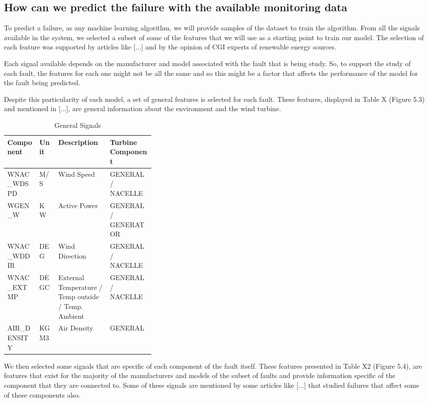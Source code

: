 
\subsection{How can we predict the failure with the available monitoring data} 
\label{sub:if_you_use_this_template} 

To predict a failure, as any machine learning algorithm, we will provide samples of the dataset to train the algorithm. From all the signals available in the system, we selected a subset of some of the features that we will use as a starting point to train our model. The selection of each feature was supported by articles like \cite{OLD_41_WIND} [...] and by the opinion of CGI experts of renewable energy sources.

Each signal available depends on the manufacturer and model associated with the fault that is being study. So, to support the study of each fault, the features for each one might not be all the same and so this might be a factor that affects the performance of the model for the fault being predicted.

Despite this particularity of each model, a set of general features is selected for each fault. These features, displayed in Table X (Figure 5.3) and mentioned in \cite{OLD_41_WIND} [...], are general information about the environment and the wind turbine.

\begin{table}[!ht]
    \centering
    \begin{tabular}{|l|l|p{0.35\linewidth}|l|}
    \hline
        Component & Unit & Description & Turbine Component \\ \hline
        WNAC\_WDSPD & M/S & Wind Speed & GENERAL / NACELLE \\ \hline
        WGEN\_W & KW & Active Power & GENERAL / GENERATOR \\ \hline
        WNAC\_WDDIR & DEG & Wind Direction & GENERAL / NACELLE \\ \hline
        WNAC\_EXTMP & DEGC & External Temperature / Temp outside / Temp. Ambient & GENERAL / NACELLE \\ \hline
        AIR\_DENSITY & KGM3 & Air Density & GENERAL \\ \hline
    \end{tabular}
    \caption{General Signals}
    \label{GeneralSignals}
\end{table}

We then selected some signals that are specific of each component of the fault itself. These features presented in Table X2 (Figure 5.4), are features that exist for the majority of the manufacturers and models of the subset of faults and provide information specific of the component that they are connected to.
Some of these signals are mentioned by some articles like [...] that studied failures that affect some of these components also.

